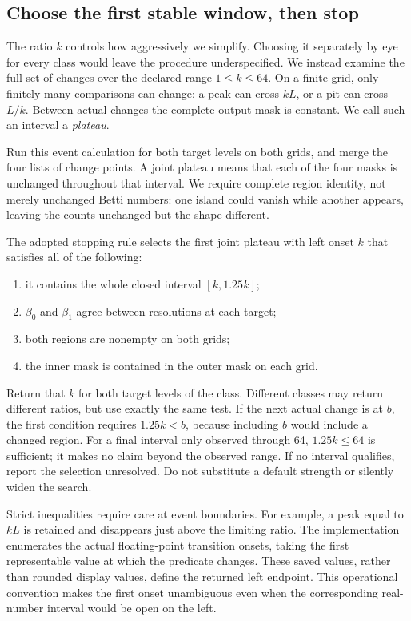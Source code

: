 \documentclass[11pt]{article}
\begin{document}
\subsection{Choose the first stable window, then stop}
\label{sec:span}

The ratio $k$ controls how aggressively we simplify. Choosing it separately
by eye for every class would leave the procedure underspecified. We instead
examine the full set of changes over the declared range $1\leq k\leq64$.
On a finite grid, only finitely many comparisons can change: a peak can
cross $kL$, or a pit can cross $L/k$. Between actual changes the complete
output mask is constant. We call such an interval a \emph{plateau}.

Run this event calculation for both target levels on both grids, and merge
the four lists of change points. A joint plateau means that each of the
four masks is unchanged throughout that interval. We require complete
region identity, not merely unchanged Betti numbers: one island could
vanish while another appears, leaving the counts unchanged but the shape
different.

The adopted stopping rule selects the first joint plateau with left onset
$k$ that satisfies all of the following:
\begin{enumerate}
\item it contains the whole closed interval $[k,1.25k]$;
\item $\beta_0$ and $\beta_1$ agree between resolutions at each target;
\item both regions are nonempty on both grids;
\item the inner mask is contained in the outer mask on each grid.
\end{enumerate}
Return that $k$ for both target levels of the class. Different classes may
return different ratios, but use exactly the same test. If the next actual
change is at $b$, the first condition requires $1.25k<b$, because including
$b$ would include a changed region. For a final interval only observed
through 64, $1.25k\leq64$ is sufficient; it makes no claim beyond the
observed range. If no interval qualifies, report the selection unresolved.
Do not substitute a default strength or silently widen the search.

Strict inequalities require care at event boundaries. For example, a peak
equal to $kL$ is retained and disappears just above the limiting ratio.
The implementation enumerates the actual floating-point transition
onsets, taking the first representable value at which the predicate
changes. These saved values, rather than rounded display values, define
the returned left endpoint. This operational convention makes the first
onset unambiguous even when the corresponding real-number interval would
be open on the left.
\end{document}

